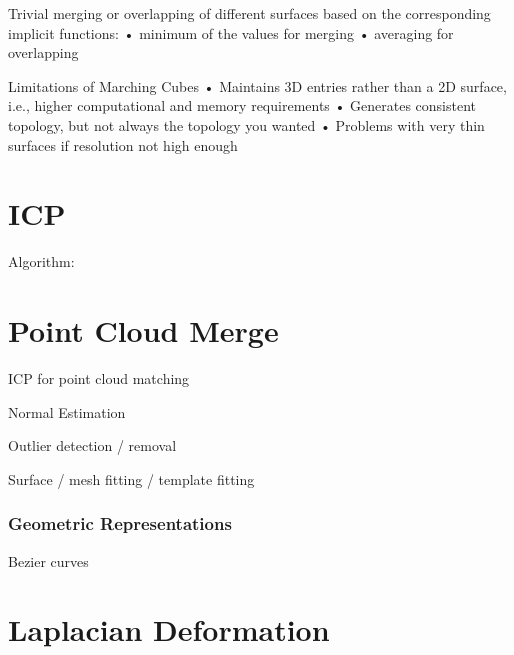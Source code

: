Trivial merging or overlapping of different surfaces based on the corresponding implicit functions:
• minimum of the values for merging • averaging for overlapping

Limitations of Marching Cubes
• Maintains 3D entries rather than a 2D surface, i.e.,
higher computational and memory requirements
• Generates consistent topology, but not always the topology you wanted
• Problems with very thin surfaces if resolution not high enough


\section{ICP}

Algorithm:

\section{Point Cloud Merge}

ICP for point cloud matching

Normal Estimation

Outlier detection / removal 

Surface / mesh fitting / template fitting

\subsubsection{Geometric Representations}

Bezier curves

\section{Laplacian Deformation}